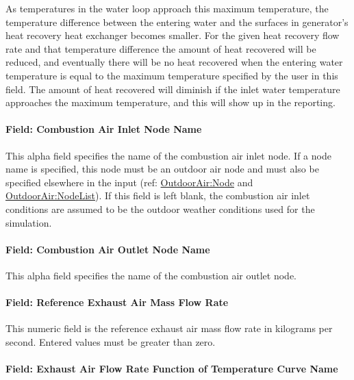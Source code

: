 As temperatures in the water loop approach this maximum temperature, the temperature difference between the entering water and the surfaces in generator's heat recovery heat exchanger becomes smaller. For the given heat recovery flow rate and that temperature difference the amount of heat recovered will be reduced, and eventually there will be no heat recovered when the entering water temperature is equal to the maximum temperature specified by the user in this field. The amount of heat recovered will diminish if the inlet water temperature approaches the maximum temperature, and this will show up in the reporting.

\paragraph{Field: Combustion Air Inlet Node Name}\label{field-combustion-air-inlet-node-name}

This alpha field specifies the name of the combustion air inlet node. If a node name is specified, this node must be an outdoor air node and must also be specified elsewhere in the input (ref: \hyperref[outdoorairnode]{OutdoorAir:Node} and \hyperref[outdoorairnodelist]{OutdoorAir:NodeList}). If this field is left blank, the combustion air inlet conditions are assumed to be the outdoor weather conditions used for the simulation.

\paragraph{Field: Combustion Air Outlet Node Name}\label{field-combustion-air-outlet-node-name}

This alpha field specifies the name of the combustion air outlet node.

\paragraph{Field: Reference Exhaust Air Mass Flow Rate}\label{field-reference-exhaust-air-mass-flow-rate}

This numeric field is the reference exhaust air mass flow rate in kilograms per second. Entered values must be greater than zero.

\paragraph{Field: Exhaust Air Flow Rate Function of Temperature Curve Name}\label{field-exhaust-air-flow-rate-function-of-temperature-curve-name}

